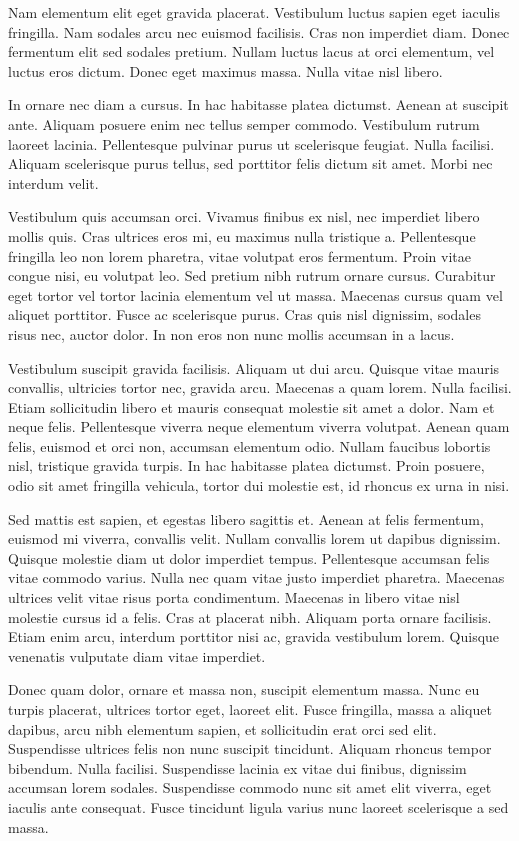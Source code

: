 \documentclass[12pt, a4paper]{article}
\begin{document}
Nam elementum elit eget gravida placerat. Vestibulum luctus sapien eget iaculis fringilla. Nam sodales arcu nec euismod facilisis. Cras non imperdiet diam. Donec fermentum elit sed sodales pretium. Nullam luctus lacus at orci elementum, vel luctus eros dictum. Donec eget maximus massa. Nulla vitae nisl libero.

In ornare nec diam a cursus. In hac habitasse platea dictumst. Aenean at suscipit ante. Aliquam posuere enim nec tellus semper commodo. Vestibulum rutrum laoreet lacinia. Pellentesque pulvinar purus ut scelerisque feugiat. Nulla facilisi. Aliquam scelerisque purus tellus, sed porttitor felis dictum sit amet. Morbi nec interdum velit.

Vestibulum quis accumsan orci. Vivamus finibus ex nisl, nec imperdiet libero mollis quis. Cras ultrices eros mi, eu maximus nulla tristique a. Pellentesque fringilla leo non lorem pharetra, vitae volutpat eros fermentum. Proin vitae congue nisi, eu volutpat leo. Sed pretium nibh rutrum ornare cursus. Curabitur eget tortor vel tortor lacinia elementum vel ut massa. Maecenas cursus quam vel aliquet porttitor. Fusce ac scelerisque purus. Cras quis nisl dignissim, sodales risus nec, auctor dolor. In non eros non nunc mollis accumsan in a lacus.

Vestibulum suscipit gravida facilisis. Aliquam ut dui arcu. Quisque vitae mauris convallis, ultricies tortor nec, gravida arcu. Maecenas a quam lorem. Nulla facilisi. Etiam sollicitudin libero et mauris consequat molestie sit amet a dolor. Nam et neque felis. Pellentesque viverra neque elementum viverra volutpat. Aenean quam felis, euismod et orci non, accumsan elementum odio. Nullam faucibus lobortis nisl, tristique gravida turpis. In hac habitasse platea dictumst. Proin posuere, odio sit amet fringilla vehicula, tortor dui molestie est, id rhoncus ex urna in nisi.

Sed mattis est sapien, et egestas libero sagittis et. Aenean at felis fermentum, euismod mi viverra, convallis velit. Nullam convallis lorem ut dapibus dignissim. Quisque molestie diam ut dolor imperdiet tempus. Pellentesque accumsan felis vitae commodo varius. Nulla nec quam vitae justo imperdiet pharetra. Maecenas ultrices velit vitae risus porta condimentum. Maecenas in libero vitae nisl molestie cursus id a felis. Cras at placerat nibh. Aliquam porta ornare facilisis. Etiam enim arcu, interdum porttitor nisi ac, gravida vestibulum lorem. Quisque venenatis vulputate diam vitae imperdiet.

Donec quam dolor, ornare et massa non, suscipit elementum massa. Nunc eu turpis placerat, ultrices tortor eget, laoreet elit. Fusce fringilla, massa a aliquet dapibus, arcu nibh elementum sapien, et sollicitudin erat orci sed elit. Suspendisse ultrices felis non nunc suscipit tincidunt. Aliquam rhoncus tempor bibendum. Nulla facilisi. Suspendisse lacinia ex vitae dui finibus, dignissim accumsan lorem sodales. Suspendisse commodo nunc sit amet elit viverra, eget iaculis ante consequat. Fusce tincidunt ligula varius nunc laoreet scelerisque a sed massa.
\end{document}
